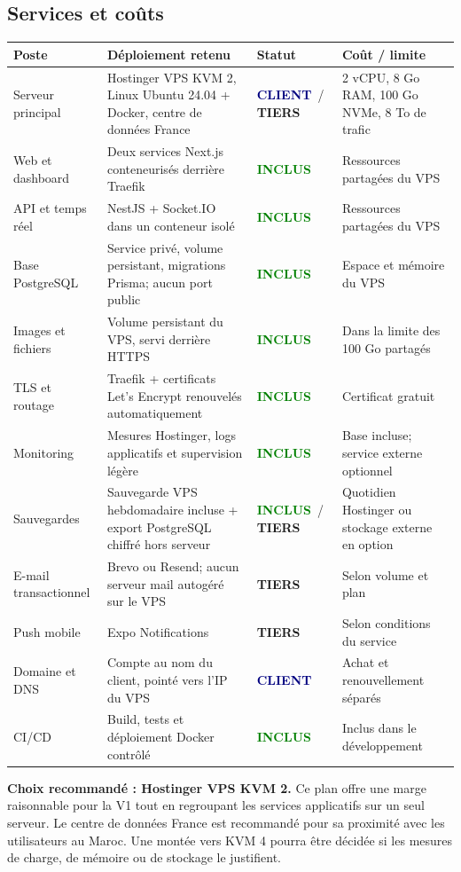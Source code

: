 \documentclass[10pt,a4paper]{article}
\newcommand{\tagbox}[2]{\colorbox{#1!14}{\textcolor{#1}{\textbf{\scriptsize #2}}}}
\newcommand{\included}{\tagbox{green}{INCLUS}}
\newcommand{\client}{\tagbox{navy}{CLIENT}}
\newcommand{\thirdparty}{\tagbox{terracotta}{TIERS}}
\begin{document}
\subsection{Services et coûts}
\begin{longtable}{@{}L{3.1cm}L{5.8cm}L{3.1cm}L{4.1cm}@{}}
\toprule
\textbf{Poste} & \textbf{Déploiement retenu} & \textbf{Statut} & \textbf{Coût / limite} \\
\midrule
\endhead
Serveur principal & Hostinger VPS KVM 2, Linux Ubuntu 24.04 + Docker, centre de données France & \client\ / \thirdparty & 2 vCPU, 8 Go RAM, 100 Go NVMe, 8 To de trafic \\
Web et dashboard & Deux services Next.js conteneurisés derrière Traefik & \included & Ressources partagées du VPS \\
API et temps réel & NestJS + Socket.IO dans un conteneur isolé & \included & Ressources partagées du VPS \\
Base PostgreSQL & Service privé, volume persistant, migrations Prisma; aucun port public & \included & Espace et mémoire du VPS \\
Images et fichiers & Volume persistant du VPS, servi derrière HTTPS & \included & Dans la limite des 100 Go partagés \\
TLS et routage & Traefik + certificats Let's Encrypt renouvelés automatiquement & \included & Certificat gratuit \\
Monitoring & Mesures Hostinger, logs applicatifs et supervision légère & \included & Base incluse; service externe optionnel \\
Sauvegardes & Sauvegarde VPS hebdomadaire incluse + export PostgreSQL chiffré hors serveur & \included\ / \thirdparty & Quotidien Hostinger ou stockage externe en option \\
E-mail transactionnel & Brevo ou Resend; aucun serveur mail autogéré sur le VPS & \thirdparty & Selon volume et plan \\
Push mobile & Expo Notifications & \thirdparty & Selon conditions du service \\
Domaine et DNS & Compte au nom du client, pointé vers l'IP du VPS & \client & Achat et renouvellement séparés \\
CI/CD & Build, tests et déploiement Docker contrôlé & \included & Inclus dans le développement \\
\bottomrule
\end{longtable}

\textbf{Choix recommandé : Hostinger VPS KVM 2.} Ce plan offre une marge raisonnable pour la V1 tout en regroupant les services applicatifs sur un seul serveur. Le centre de données France est recommandé pour sa proximité avec les utilisateurs au Maroc. Une montée vers KVM 4 pourra être décidée si les mesures de charge, de mémoire ou de stockage le justifient.
\end{document}
